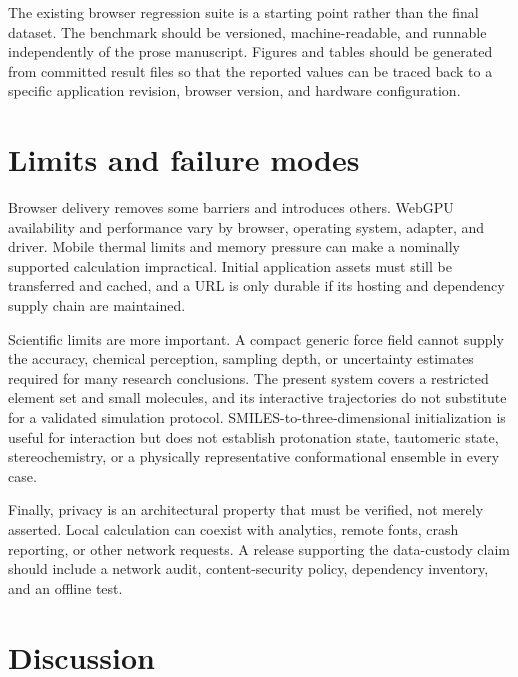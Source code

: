 \documentclass[11pt]{article}
\newif\ifdraft
\newcommand{\draftnote}[1]{%
  \ifdraft
    \par\noindent
    \colorbox{yellow!20}{%
      \parbox{\dimexpr\linewidth-2\fboxsep\relax}{%
        \textbf{Draft note:} #1%
      }%
    }%
    \par
  \fi
}
\begin{document}
The existing browser regression suite is a starting point rather than the final
dataset.
The benchmark should be versioned, machine-readable, and runnable independently
of the prose manuscript.
Figures and tables should be generated from committed result files so that the
reported values can be traced back to a specific application revision, browser
version, and hardware configuration.

\draftnote{Add the molecule panel, acceptance thresholds, browser/device matrix,
  and measured results. Do not promote a test from ``planned'' to ``validated''
  without an archived machine-readable output.}

\FloatBarrier

\section{Limits and failure modes}
\label{sec:limits}

Browser delivery removes some barriers and introduces others.
WebGPU availability and performance vary by browser, operating system, adapter,
and driver.
Mobile thermal limits and memory pressure can make a nominally supported
calculation impractical.
Initial application assets must still be transferred and cached, and a URL is
only durable if its hosting and dependency supply chain are maintained.

Scientific limits are more important.
A compact generic force field cannot supply the accuracy, chemical perception,
sampling depth, or uncertainty estimates required for many research conclusions.
The present system covers a restricted element set and small molecules, and its
interactive trajectories do not substitute for a validated simulation protocol.
SMILES-to-three-dimensional initialization is useful for interaction but does not
establish protonation state, tautomeric state, stereochemistry, or a physically
representative conformational ensemble in every case.

Finally, privacy is an architectural property that must be verified, not merely
asserted.
Local calculation can coexist with analytics, remote fonts, crash reporting, or
other network requests.
A release supporting the data-custody claim should include a network audit,
content-security policy, dependency inventory, and an offline test.

\section{Discussion}
\label{sec:discussion}
\end{document}
